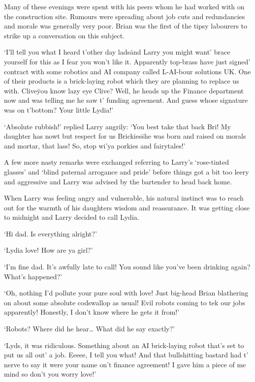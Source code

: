 Many of these evenings were spent with his peers whom he had worked
with on the construction site. Rumours were spreading about job cuts
and redundancies and morale was generally very poor. Brian was the
first of the tipsy labourers to strike up a conversation on this
subject.

`I'll tell you what I heard t'other day lads\=and Larry you might
want' brace yourself for this as I fear you won't like it. Apparently
top-brass have just signed' contract with some robotics and AI company
called L-AI-bour solutions UK. One of their products is a brick-laying
robot which they are planning to replace us with. Clive\=you know lazy
eye Clive? Well, he heads up the Finance department now and was
telling me he saw t' funding agreement. And guess whose signature was
on t'bottom? Your little Lydia!'

`Absolute rubbish!' replied Larry angrily: `You best take that back
Bri! My daughter has nowt but respect for us Brickies\=she was born
and raised on morals and mortar, that lass! So, stop wi'ya porkies and
fairytales!'

A few more nasty remarks were exchanged referring to Larry's
`rose-tinted glasses' and `blind paternal arrogance and pride' before
things got a bit too leery and aggressive and Larry was advised by the
bartender to head back home.

When Larry was feeling angry and vulnerable, his natural instinct was
to reach out for the warmth of his daughters wisdom and
reassurance. It was getting close to midnight and Larry decided to
call Lydia.

`Hi dad. Is everything alright?'

`Lydia love! How are ya girl?'

`I'm fine dad. It's awfully late to call! You sound like you've been
drinking again? What's happened?'

`Oh, nothing I'd pollute your pure soul with love! Just big-head Brian
blathering on about some absolute codswallop as usual! Evil robots
coming to tek our jobs apparently! Honestly, I don't know where he
gets it from!'

`Robots? Where did he hear… What did he say exactly?'

`Lyds, it was ridiculous. Something about an AI brick-laying robot
that's set to put us all out' a job. Eeeee, I tell you what! And that
bullshitting bastard had t' nerve to say it were your name on't
finance agreement! I gave him a piece of me mind so don't you worry
love!'


